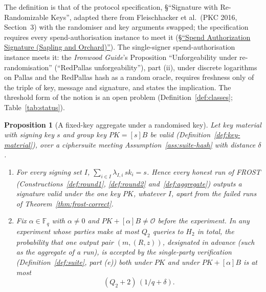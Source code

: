 \documentclass[11pt,a4paper]{article}
\newtheorem{proposition}[theorem]{Proposition}
\theoremstyle{definition}
\newcommand{\F}{\mathbb{F}}
\newcommand{\Fq}{\F_q}
\begin{document}
The definition is that of the protocol specification, \S``Signature with
Re-Randomizable Keys'', adapted there from Fleischhacker et al.\ (PKC 2016,
Section~3) with the randomiser and key arguments swapped; the specification
requires every spend-authorisation instance to meet it
(\href{https://zips.z.cash/protocol/protocol.pdf\#concretespendauthsig}%
{\S``Spend Authorization Signature (Sapling and Orchard)''}). The
single-signer spend-authorisation instance meets it: the \emph{Ironwood
Guide}'s Proposition ``Unforgeability under re-randomisation'' (``RedPallas
unforgeability''), part (ii), under discrete logarithms on Pallas and the
RedPallas hash as a random oracle, requires freshness only of the triple of
key, message and signature, and states the implication. The threshold form
of the notion is an open problem (Definition~\ref{def:classes};
Table~\ref{tab:status}).

\begin{proposition}[A fixed-key aggregate under a randomised key]
\label{prop:rr-gap}
Let key material with signing key \(s\) and group key
\(\mathit{PK} = [s]B\) be valid (Definition~\ref{def:key-material}), over a
ciphersuite meeting Assumption~\ref{ass:suite-hash} with distance
\(\delta\).
\begin{enumerate}
\item[(i)] For every signing set \(I\),
  \(\sum_{i \in I} \lambda_{I,i}\, \mathit{sk}_i = s\). Hence every honest
  run of FROST (Constructions~\ref{def:round1}, \ref{def:round2}
  and~\ref{def:aggregate}) outputs a signature valid under the one key
  \(\mathit{PK}\), whatever \(I\), apart from the failed runs of
  Theorem~\ref{thm:frost-correct}.
\item[(ii)] Fix \(\alpha \in \Fq\) with \(\alpha \ne 0\) and
  \(\mathit{PK} + [\alpha]B \ne \mathcal{O}\) before the experiment. In any
  experiment whose parties make at most \(Q_2\) queries to \(H_2\) in total,
  the probability that one output pair \((m, (R, z))\), designated in
  advance (such as the aggregate of a run), is accepted by the
  single-party verification (Definition~\ref{def:suite}, part (e)) both
  under \(\mathit{PK}\) and under \(\mathit{PK} + [\alpha]B\) is at most
  \[
    (Q_2 + 2)\,(1/q + \delta) .
  \]
\end{enumerate}
\end{proposition}
\end{document}
